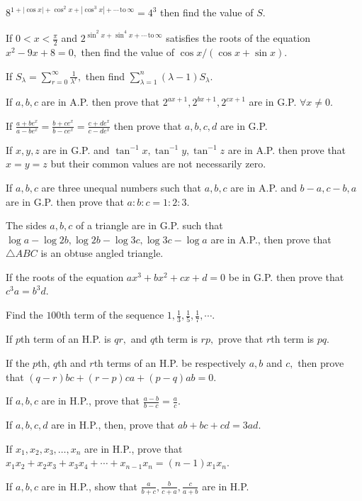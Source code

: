   $8^{1 + |\cos x| + \cos^2x + |\cos^3x| + \cdots\,\text{to}\,\infty} = 4^3$ then find the value of $S$.
\item If $0 < x <\frac{\pi}{2}$ and $2^{\sin^2x + \sin^4x + \cdots\,\text{to}\,\infty}$ satisfies the roots of the equation
  $x^2 - 9x + 8 = 0,$ then find the value of $\cos x/(\cos x + \sin x)$.
\item If $\displaystyle S_\lambda = \sum_{r=0}^\infty \frac{1}{\lambda^r},$ then find $\displaystyle\sum_{\lambda = 1}^n(\lambda - 1)S_\lambda$.
\item If $a, b, c$ are in A.P. then prove that $2^{ax + 1}, 2^{bx + 1}, 2^{cx + 1}$ are in G.P. $\forall x\neq 0$.
\item If $\frac{a + be^x}{a - be^x} = \frac{b + ce^x}{b - ce^x} = \frac{c + de^x}{c - de^x}$ then prove that $a, b, c, d$
  are in G.P.
\item If $x, y, z$ are in G.P. and $\tan^{-1}x, \tan^{-1}y, \tan^{-1}z$ are in A.P. then prove that $x = y = z$ but their
  common values are not necessarily zero.
\item If $a, b, c$ are three unequal numbers such that $a, b, c$ are in A.P. and $b - a, c - b, a$ are in G.P. then prove
  that $a:b:c = 1:2:3$.
\item The sides $a,b,c$ of a triangle are in G.P. such that $\log a - \log 2b, \log 2b - \log 3c, \log 3c - \log a$ are in
  A.P., then prove that $\triangle ABC$ is an obtuse angled triangle.
\item If the roots of the equation $ax^3 + bx^2 + cx + d = 0$ be in G.P. then prove that $c^3a = b^3d$.
\item Find the $100$th term of the sequence $1, \frac{1}{3}, \frac{1}{5}, \frac{1}{7}, \cdots$.
\item If $p$th term of an H.P. is $qr,$ and $q$th term is $rp,$ prove that $r$th term is $pq$.
\item If the $p$th, $q$th and $r$th terms of an H.P. be respectively $a, b$ and $c,$ then prove that $(q - r)bc + (r - p)ca + (p -
  q)ab = 0$.
\item If $a, b, c$ are in H.P., prove that $\frac{a - b}{b - c} = \frac{a}{c}$.
\item If $a, b, c, d$ are in H.P., then, prove that $ab + bc + cd = 3ad$.
\item If $x_1, x_2, x_3, \ldots, x_n$ are in H.P., prove that $x_1x_2 + x_2x_3 + x_3x_4 + \cdots + x_{n - 1}x_n = (n - 1)x_1x_n$.
\item If $a, b, c$ are in H.P., show that $\frac{a}{b + c}, \frac{b}{c + a}, \frac{c}{a + b}$ are in H.P.
